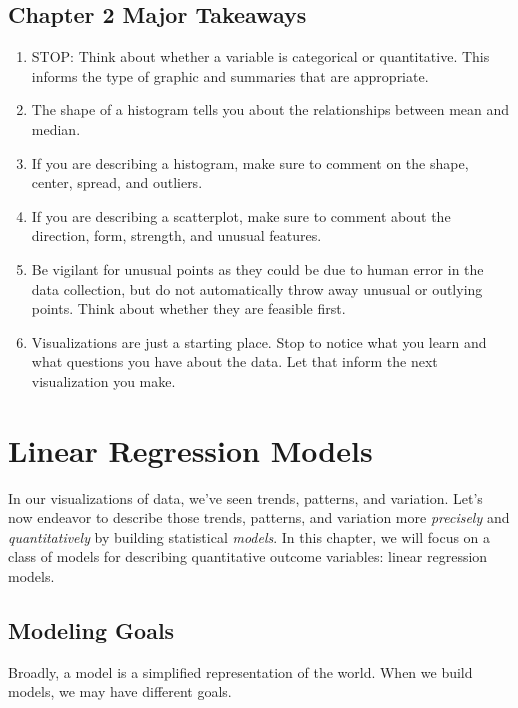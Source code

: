 \documentclass[
]{book}
\begin{document}
\hypertarget{chapter-2-major-takeaways}{%
\section{Chapter 2 Major Takeaways}\label{chapter-2-major-takeaways}}

\begin{enumerate}
\def\labelenumi{\arabic{enumi}.}
\item
  STOP: Think about whether a variable is categorical or quantitative. This informs the type of graphic and summaries that are appropriate.
\item
  The shape of a histogram tells you about the relationships between mean and median.
\item
  If you are describing a histogram, make sure to comment on the shape, center, spread, and outliers.
\item
  If you are describing a scatterplot, make sure to comment about the direction, form, strength, and unusual features.
\item
  Be vigilant for unusual points as they could be due to human error in the data collection, but do not automatically throw away unusual or outlying points. Think about whether they are feasible first.
\item
  Visualizations are just a starting place. Stop to notice what you learn and what questions you have about the data. Let that inform the next visualization you make.
\end{enumerate}

\hypertarget{linear-regression-models}{%
\chapter{Linear Regression Models}\label{linear-regression-models}}

In our visualizations of data, we've seen trends, patterns, and variation. Let's now endeavor to describe those trends, patterns, and variation more \emph{precisely} and \emph{quantitatively} by building statistical \emph{models}. In this chapter, we will focus on a class of models for describing quantitative outcome variables: linear regression models.

\hypertarget{modeling-goals}{%
\section{Modeling Goals}\label{modeling-goals}}

Broadly, a model is a simplified representation of the world. When we build models, we may have different goals.
\end{document}
